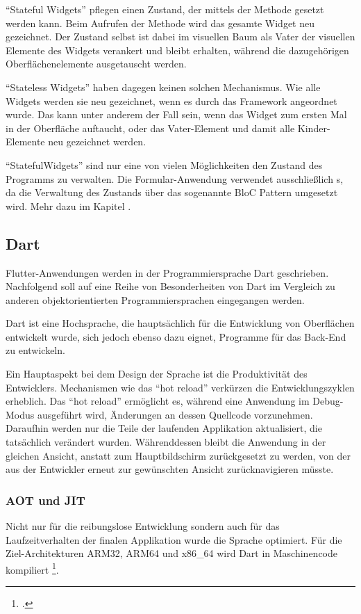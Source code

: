 \enquote{Stateful Widgets} pflegen einen Zustand, der mittels der Methode  gesetzt werden kann.
Beim Aufrufen der Methode wird das gesamte Widget neu gezeichnet.
Der Zustand selbst ist dabei im visuellen Baum als Vater der visuellen Elemente des Widgets verankert und bleibt erhalten, während die dazugehörigen Oberflächenelemente ausgetauscht werden.

\enquote{Stateless Widgets} haben dagegen keinen solchen Mechanismus.
Wie alle Widgets werden sie neu gezeichnet, wenn es durch das Framework angeordnet wurde.
Das kann unter anderem der Fall sein, wenn das Widget zum ersten Mal in der Oberfläche auftaucht, oder das Vater-Element und damit alle Kinder-Elemente neu gezeichnet werden.

\enquote{StatefulWidgets} sind nur eine von vielen Möglichkeiten den Zustand des Programms zu verwalten.
Die Formular-Anwendung verwendet ausschließlich s, da die Verwaltung des Zustands über das sogenannte BloC Pattern umgesetzt wird.
Mehr dazu im Kapitel .


\subsection{Dart}

Flutter-Anwendungen werden in der Programmiersprache Dart geschrieben.
Nachfolgend soll auf eine Reihe von Besonderheiten von Dart im Vergleich zu anderen objektorientierten Programmiersprachen eingegangen werden.

Dart ist eine Hochsprache, die hauptsächlich für die Entwicklung von Oberflächen entwickelt wurde, sich jedoch ebenso dazu eignet, Programme für das Back-End zu entwickeln.

Ein Hauptaspekt bei dem Design der Sprache ist die Produktivität des Entwicklers.
Mechanismen wie das \enquote{hot reload} verkürzen die Entwicklungszyklen erheblich.
Das \enquote{hot reload} ermöglicht es, während eine Anwendung im Debug-Modus ausgeführt wird, Änderungen an dessen Quellcode vorzunehmen.
Daraufhin werden nur die Teile der laufenden Applikation aktualisiert, die tatsächlich verändert wurden.
 Währenddessen bleibt die Anwendung in der gleichen Ansicht, anstatt zum Hauptbildschirm zurückgesetzt zu werden, von der aus der Entwickler erneut zur gewünschten Ansicht zurücknavigieren müsste.

\subsubsection{AOT und JIT}
Nicht nur für die reibungslose Entwicklung sondern auch für das Laufzeitverhalten der finalen Applikation wurde die Sprache optimiert.
Für die Ziel-Architekturen ARM32, ARM64 und x86_64 wird Dart in Maschinencode kompiliert \footcite[Vgl.][]{DartThePlatforms}.

